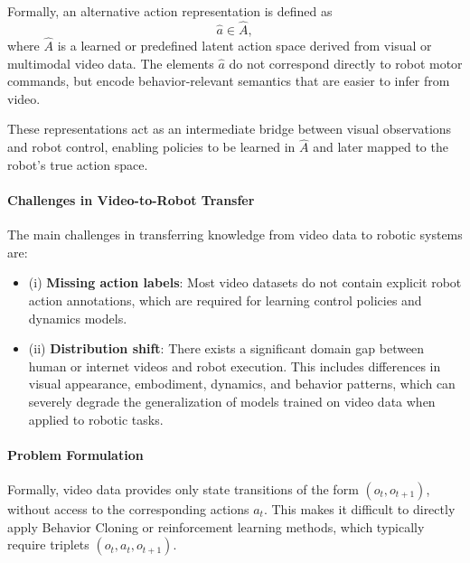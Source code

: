 Formally, an alternative action representation is defined as
\[
\hat{a} \in \hat{A},
\]
where $\hat{A}$ is a learned or predefined latent action space derived from visual or multimodal video data. The elements $\hat{a}$ do not correspond directly to robot motor commands, but encode behavior-relevant semantics that are easier to infer from video.

These representations act as an intermediate bridge between visual observations and robot control, enabling policies to be learned in $\hat{A}$ and later mapped to the robot's true action space.


















\paragraph{Challenges in Video-to-Robot Transfer}

The main challenges in transferring knowledge from video data to robotic systems are:
\begin{itemize}
    \item (i) \textbf{Missing action labels}: Most video datasets do not contain explicit robot action annotations, which are required for learning control policies and dynamics models.
    \item (ii) \textbf{Distribution shift}: There exists a significant domain gap between human or internet videos and robot execution. This includes differences in visual appearance, embodiment, dynamics, and behavior patterns, which can severely degrade the generalization of models trained on video data when applied to robotic tasks.
\end{itemize}

\paragraph{Problem Formulation}

Formally, video data provides only state transitions of the form $(o_t, o_{t+1})$, without access to the corresponding actions $a_t$. This makes it difficult to directly apply Behavior Cloning or reinforcement learning methods, which typically require triplets $(o_t, a_t, o_{t+1})$.

